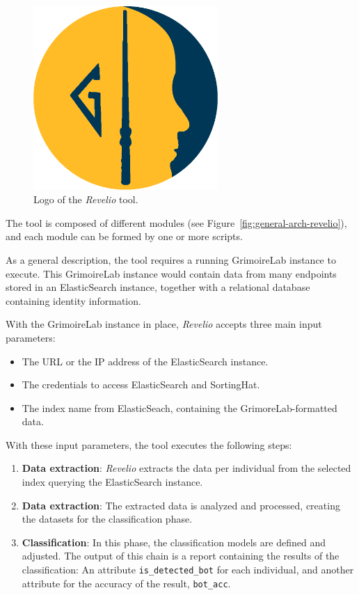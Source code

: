 \documentclass[a4paper, 12pt]{book}
\begin{document}
\begin{figure}
  \centering
  \includegraphics[width=7cm, keepaspectratio]{img/revelio-logo.png}
  \caption{Logo of the \emph{Revelio} tool.}
  \label{fig:logo-revelio}
\end{figure}

The tool is composed of different modules (see Figure~\ref{fig:general-arch-revelio}), and each module can be formed by one or more scripts.

As a general description, the tool requires a running GrimoireLab instance to execute. This GrimoireLab instance would contain data from many endpoints stored in an ElasticSearch instance, together with a relational database containing identity information.

With the GrimoireLab instance in place, \emph{Revelio} accepts three main input parameters:
\begin{itemize}
    \item The URL or the IP address of the ElasticSearch instance.
    \item The credentials to access ElasticSearch and SortingHat.
    \item The index name from ElasticSeach, containing the GrimoreLab-formatted data.
\end{itemize}

With these input parameters, the tool executes the following steps:

\begin{enumerate}
    \item \textbf{Data extraction}: \emph{Revelio} extracts the data
    per individual from the selected index querying the
    ElasticSearch instance.
    \item \textbf{Data extraction}: The extracted data is analyzed
    and processed, creating the datasets for the classification
    phase.
    \item \textbf{Classification}: In this phase, the classification
    models are defined and adjusted. The output of this chain is a
    report containing the results of the classification: An
    attribute \texttt{is\_detected\_bot} for each individual, and
    another attribute for the accuracy of the result, \texttt{bot\_acc}.
\end{enumerate}
\end{document}
